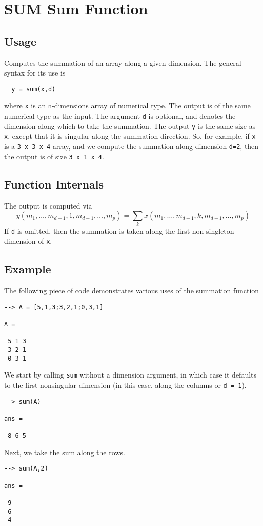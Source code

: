 \section{SUM Sum Function}

\subsection{Usage}

Computes the summation of an array along a given dimension.  The general
syntax for its use is
\begin{verbatim}
  y = sum(x,d)
\end{verbatim}
where \verb|x| is an \verb|n|-dimensions array of numerical type.
The output is of the same numerical type as the input.  The argument
\verb|d| is optional, and denotes the dimension along which to take
the summation.  The output \verb|y| is the same size as \verb|x|, except
that it is singular along the summation direction.  So, for example,
if \verb|x| is a \verb|3 x 3 x 4| array, and we compute the summation along
dimension \verb|d=2|, then the output is of size \verb|3 x 1 x 4|.
\subsection{Function Internals}

The output is computed via
\[
y(m_1,\ldots,m_{d-1},1,m_{d+1},\ldots,m_{p}) = 
\sum_{k} x(m_1,\ldots,m_{d-1},k,m_{d+1},\ldots,m_{p})
\]
If \verb|d| is omitted, then the summation is taken along the 
first non-singleton dimension of \verb|x|. 
\subsection{Example}

The following piece of code demonstrates various uses of the summation
function
\begin{verbatim}
--> A = [5,1,3;3,2,1;0,3,1]

A = 

 5 1 3 
 3 2 1 
 0 3 1 
\end{verbatim}
We start by calling \verb|sum| without a dimension argument, in which 
case it defaults to the first nonsingular dimension (in this case, 
along the columns or \verb|d = 1|).
\begin{verbatim}
--> sum(A)

ans = 

 8 6 5 
\end{verbatim}
Next, we take the sum along the rows.
\begin{verbatim}
--> sum(A,2)

ans = 

 9 
 6 
 4 
\end{verbatim}
